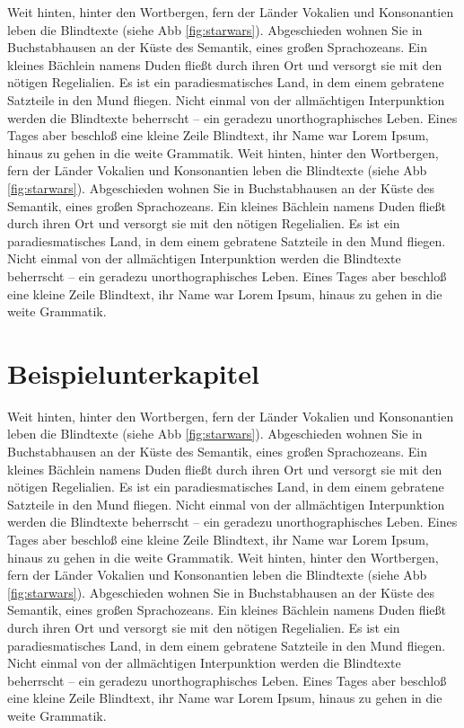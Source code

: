 Weit hinten, hinter den Wortbergen, fern der Länder Vokalien und Konsonantien leben die Blindtexte (siehe Abb \ref{fig:starwars}). Abgeschieden wohnen Sie in Buchstabhausen an der Küste des Semantik, eines großen Sprachozeans. Ein kleines Bächlein namens Duden fließt durch ihren Ort und versorgt sie mit den nötigen Regelialien. Es ist ein paradiesmatisches Land, in dem einem gebratene Satzteile in den Mund fliegen. Nicht einmal von der allmächtigen Interpunktion werden die Blindtexte beherrscht – ein geradezu unorthographisches Leben. Eines Tages aber beschloß eine kleine Zeile Blindtext, ihr Name war Lorem Ipsum, hinaus zu gehen in die weite Grammatik.
Weit hinten, hinter den Wortbergen, fern der Länder Vokalien und Konsonantien leben die Blindtexte (siehe Abb \ref{fig:starwars}). Abgeschieden wohnen Sie in Buchstabhausen an der Küste des Semantik, eines großen Sprachozeans. Ein kleines Bächlein namens Duden fließt durch ihren Ort und versorgt sie mit den nötigen Regelialien. Es ist ein paradiesmatisches Land, in dem einem gebratene Satzteile in den Mund fliegen. Nicht einmal von der allmächtigen Interpunktion werden die Blindtexte beherrscht – ein geradezu unorthographisches Leben. Eines Tages aber beschloß eine kleine Zeile Blindtext, ihr Name war Lorem Ipsum, hinaus zu gehen in die weite Grammatik.


\section{Beispielunterkapitel}
\label{subsec:beispiel}

Weit hinten, hinter den Wortbergen, fern der Länder Vokalien und Konsonantien leben die Blindtexte (siehe Abb \ref{fig:starwars}). Abgeschieden wohnen Sie in Buchstabhausen an der Küste des Semantik, eines großen Sprachozeans. Ein kleines Bächlein namens Duden fließt durch ihren Ort und versorgt sie mit den nötigen Regelialien. Es ist ein paradiesmatisches Land, in dem einem gebratene Satzteile in den Mund fliegen. Nicht einmal von der allmächtigen Interpunktion werden die Blindtexte beherrscht – ein geradezu unorthographisches Leben. Eines Tages aber beschloß eine kleine Zeile Blindtext, ihr Name war Lorem Ipsum, hinaus zu gehen in die weite Grammatik.
Weit hinten, hinter den Wortbergen, fern der Länder Vokalien und Konsonantien leben die Blindtexte (siehe Abb \ref{fig:starwars}). Abgeschieden wohnen Sie in Buchstabhausen an der Küste des Semantik, eines großen Sprachozeans. Ein kleines Bächlein namens Duden fließt durch ihren Ort und versorgt sie mit den nötigen Regelialien. Es ist ein paradiesmatisches Land, in dem einem gebratene Satzteile in den Mund fliegen. Nicht einmal von der allmächtigen Interpunktion werden die Blindtexte beherrscht – ein geradezu unorthographisches Leben. Eines Tages aber beschloß eine kleine Zeile Blindtext, ihr Name war Lorem Ipsum, hinaus zu gehen in die weite Grammatik.